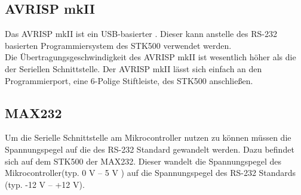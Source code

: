 \subsection{AVRISP mkII}
\label{sec:AVRISP}
Das AVRISP mkII ist ein USB-basierter . Dieser kann anstelle des RS-232 basierten Programmiersystem des STK500 verwendet werden.\\
Die Übertragungsgeschwindigkeit des AVRISP mkII ist wesentlich höher als die der Seriellen Schnittstelle. 
Der AVRISP mkII lässt sich einfach an den Programmierport, eine 6-Polige Stiftleiste, des STK500 anschließen.

\subsection{MAX232}
\label{sec:MAX232}
Um die Serielle Schnittstelle am Mikrocontroller nutzen zu können müssen die Spannungspegel auf die des RS-232 Standard gewandelt werden. Dazu befindet sich auf dem STK500 der  MAX232. 
Dieser wandelt die Spannungspegel des Mikrocontroller(typ. 0 V -- 5 V ) auf die Spannungspegel des RS-232 Standards (typ. -12 V -- +12 V).
